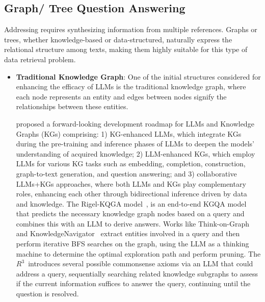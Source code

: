 \subsection{Graph/ Tree Question Answering}

Addressing \secondlevel requires synthesizing information from multiple references. Graphs or trees, whether knowledge-based or data-structured, naturally express the relational structure among texts, making them highly suitable for this type of data retrieval problem.

\begin{itemize}
    \item \textbf{Traditional Knowledge Graph}: One of the initial structures considered for enhancing the efficacy of LLMs is the traditional knowledge graph, where each node represents an entity and edges between nodes signify the relationships between these entities. 
    
    \cite{Pan2023UnifyingLL} proposed a forward-looking development roadmap for LLMs and Knowledge Graphs (KGs) comprising: 1) KG-enhanced LLMs, which integrate KGs during the pre-training and inference phases of LLMs to deepen the models' understanding of acquired knowledge; 2) LLM-enhanced KGs, which employ LLMs for various KG tasks such as embedding, completion, construction, graph-to-text generation, and question answering; and 3) collaborative LLMs+KGs approaches, where both LLMs and KGs play complementary roles, enhancing each other through bidirectional inference driven by data and knowledge. The Rigel-KQGA model~\cite{sen-etal-2023-knowledge}, is an end-to-end KGQA model that predicts the necessary knowledge graph nodes based on a query and combines this with an LLM to derive answers. Works like Think-on-Graph~\cite{sun2023thinkongraph}  and KnowledgeNavigator~\cite{guo2023knowledgenavigator} extract entities involved in a query and then perform iterative BFS searches on the graph, using the LLM as a thinking machine to determine the optimal exploration path and perform pruning. The $R^3$~\cite{r3}introduces several possible commonsense axioms via an LLM that could address a query, sequentially searching related knowledge subgraphs to assess if the current information suffices to answer the query, continuing until the question is resolved.
    

\end{itemize}
